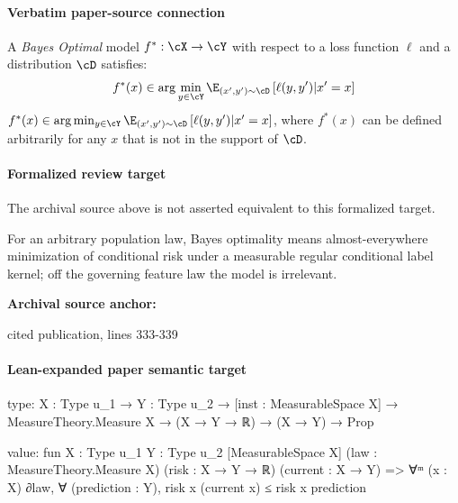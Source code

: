 \documentclass[10pt]{article}
\begin{document}
\paragraph{Verbatim paper-source connection}
\begin{ReviewVerbatim}
\begin{definition}
A \emph{Bayes Optimal} model $f^*:\cX \rightarrow \cY$ with respect to a loss function $\ell$ and a distribution $\cD$ satisfies:
\ifdraft
$$f^*(x) \in \arg\min_{y \in \cY} \E_{(x', y') \sim \cD}\left[\ell(y, y') | x' = x\right]$$
\else $f^*(x) \in \arg\min_{y \in \cY} \E_{(x', y') \sim \cD}\left[\ell(y, y') | x' = x\right]$, \fi
where $f^*(x)$ can be defined arbitrarily for any $x$ that is not in the support of $\cD$.
\end{definition}
\end{ReviewVerbatim}


\paragraph{Formalized review target}
The archival source above is not asserted equivalent to this formalized target.
\begin{ReviewVerbatim}
For an arbitrary population law, Bayes optimality means almost-everywhere minimization of conditional risk under a measurable regular conditional label kernel; off the governing feature law the model is irrelevant.
\end{ReviewVerbatim}

\textbf{Archival source anchor:} {\footnotesize\raggedright cited publication, lines 333-\allowbreak{}339\par}
\paragraph{Lean-expanded paper semantic target}
\begin{ReviewVerbatim}
type:
{X : Type u_1} → {Y : Type u_2} → [inst : MeasurableSpace X] → MeasureTheory.Measure X → (X → Y → ℝ) → (X → Y) → Prop

value:
fun {X : Type u_1} {Y : Type u_2} [MeasurableSpace X] (law : MeasureTheory.Measure X) (risk : X → Y → ℝ)
    (current : X → Y) =>
  ∀ᵐ (x : X) ∂law, ∀ (prediction : Y), risk x (current x) ≤ risk x prediction
\end{ReviewVerbatim}
\end{document}
